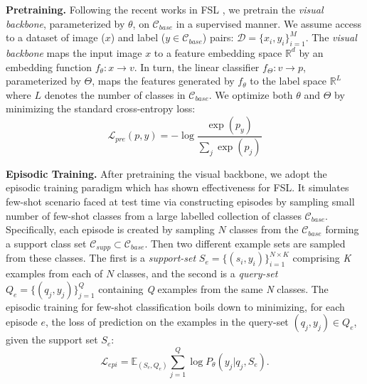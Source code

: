 \documentclass{bmvc2k}
\begin{document}
\noindent \textbf{Pretraining.}  Following the recent works in FSL \cite{chen2020new,simpleshot}, we pretrain the \textit{visual backbone}, parameterized by $\theta$, on $\mathcal{C}_{base}$ in a supervised manner. We assume access to a dataset of image ($x$) and label ($y\in \mathcal{C}_{base}$) pairs: $\mathcal{D} = \{x_i,y_i\}_{i=1}^{M}$. The \textit{visual backbone} maps the input image $x$ to a feature embedding space $\mathbb{R}^{d}$ by an embedding function $f_{\theta}:x\rightarrow v$. In turn, the linear classifier $f_{\Theta}:v\rightarrow p$, parameterized by $\Theta$, maps the features generated by $f_{\theta}$ to the label space $\mathbb{R}^{L}$ where $L$ denotes the number of classes in $\mathcal{C}_{base}$. We optimize both $\theta$ and $\Theta$ by minimizing the standard cross-entropy loss: \\

\vspace{-2em}
\begin{equation}
\mathcal{L}_{pre}(p,y) = -\log\frac{\exp({p_y})}{\sum_j \exp({p_j})} \end{equation}

\noindent \textbf{Episodic Training.} After pretraining the visual backbone, we adopt the episodic training paradigm which has shown effectiveness for FSL. It simulates few-shot scenario faced at test time via constructing episodes by sampling small number of few-shot classes from a large labelled collection of classes $\mathcal{C}_{base}$. Specifically, each episode is created by  sampling $N$ classes from the $\mathcal{C}_{base}$ forming a support class set $\mathcal{C}_{supp} \subset \mathcal{C}_{base}$. Then two different example sets are sampled from these classes. The first is a \textit{support-set} $S_{e} = \{(s_{i},y_{i})\}_{i=1}^{N \times K}$ comprising \textit{K} examples from each of $N$ classes, and the second is a \textit{query-set} $Q_{e} = \{(q_{j},y_{j})\}_{j=1}^{Q}$ containing \textit{Q} examples from the same \textit{N} classes. The episodic training for few-shot classification boils down to minimizing, for each episode $e$, the loss of prediction on the examples in the query-set $(q_{j},y_{j}) \in Q_{e}$, given the support set $S_{e}$: 
\vspace{-0.2cm}
\begin{equation}
    \mathcal{L}_{epi} = \mathbb{E}_{(S_{e},Q_{e})}\sum_{j=1}^{Q}\log {P}_{\theta}(y_{j}|q_{j},S_{e}). \label{Eq:episodic_loss}
\end{equation}
\end{document}
